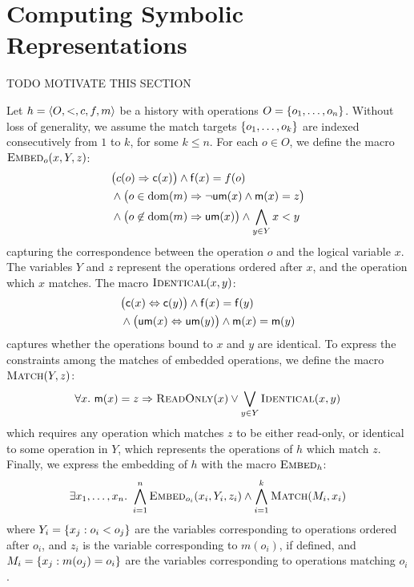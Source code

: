 \section{Computing Symbolic Representations}
\label{sec:formula}

TODO MOTIVATE THIS SECTION

Let $h = \tup{O,<,c,f,m}$ be a history with operations $O = \set{ o_1, \ldots,
o_n }$. Without loss of generality, we assume the match targets $\set{o_1,
\ldots, o_k}$ are indexed consecutively from $1$ to $k$, for some $k \le n$. 
For each $o \in O$, we define the macro $\textsc{Embed}_o(x,Y,z)$:
\begin{align*}
  & \big(c(o) \implies {\sf c}(x)\big) \land {\sf f}(x) = f(o) \\
  & \land \big(o \in \dom(m)
    \implies \lnot{\sf um}(x) \land {\sf m}(x) = z\big) \\
  & \land \big(o \not\in \dom(m) \implies {\sf um}(x)\big)
    \land \bigwedge_{y \in Y} x < y
\end{align*}
capturing the correspondence between the operation $o$ and the logical variable
$x$. The variables $Y$ and $z$ represent the operations ordered after $x$, and
the operation which $x$ matches. The macro $\textsc{Identical}(x,y)$:
\begin{align*}
  & \big({\sf c}(x) \Leftrightarrow {\sf c}(y)\big)
  \land {\sf f}(x) = {\sf f}(y) \\
  & \land \big({\sf um}(x) \Leftrightarrow {\sf um}(y)\big)
  \land {\sf m}(x) = {\sf m}(y)
\end{align*}
captures whether the operations bound to $x$ and $y$ are identical.
To express the constraints among the matches of embedded operations, we define
the macro $\textsc{Match}(Y,z)$:
\begin{align*}
  \forall x.\ {\sf m}(x) = z \implies
  \textsc{ReadOnly}(x) \lor \bigvee_{y \in Y} \textsc{Identical}(x,y)
\end{align*}
which requires any operation which matches $z$ to be either read-only, or
identical to some operation in $Y$, which represents the operations of $h$
which match $z$. Finally, we express the embedding of $h$ with the macro
$\textsc{Embed}_h$:
\begin{align*}
  \exists x_1, \ldots, x_n.\ \bigwedge_{i=1}^{n} \textsc{Embed}_{o_i}(x_i,Y_i,z_i)
  \land \bigwedge_{i=1}^{k} \textsc{Match}(M_i, x_i)
\end{align*}
where $Y_i = \set{ x_j : o_i < o_j }$ are the variables corresponding to
operations ordered after $o_i$, and $z_i$ is the variable corresponding to
$m(o_i)$, if defined, and $M_i = \set{ x_j : m(o_j) = o_i }$ are the variables
corresponding to operations matching $o_i$.

